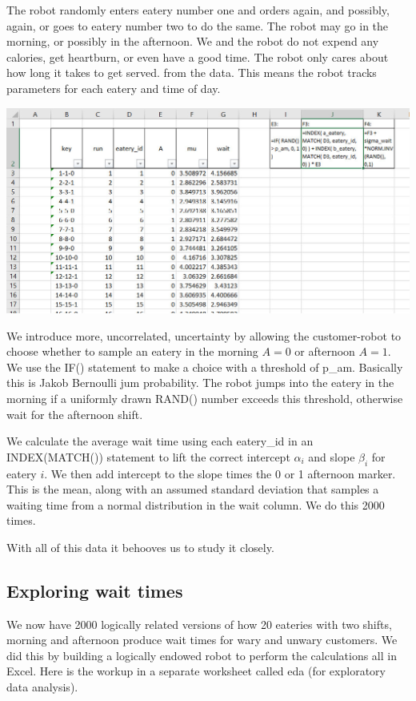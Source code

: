 \documentclass[
]{book}
\begin{document}
The robot randomly enters eatery number one and orders again, and possibly, again, or goes to eatery number two to do the same. The robot may go in the morning, or possibly in the afternoon. We and the robot do not expend any calories, get heartburn, or even have a good time. The robot only cares about how long it takes to get served.
from the data. This means the robot tracks parameters for each eatery and time of day.

\includegraphics{images/05/eatery-simulation-calculation.jpg}

We introduce more, uncorrelated, uncertainty by allowing the customer-robot to choose whether to sample an eatery in the morning \(A=0\) or afternoon \(A=1\). We use the IF() statement to make a choice with a threshold of p\_am. Basically this is Jakob Bernoulli jum probability. The robot jumps into the eatery in the morning if a uniformly drawn RAND() number exceeds this threshold, otherwise wait for the afternoon shift.

We calculate the average wait time using each eatery\_id in an INDEX(MATCH()) statement to lift the correct intercept \(\alpha_i\) and slope \(\beta_i\) for eatery \(i\). We then add intercept to the slope times the 0 or 1 afternoon marker. This is the mean, along with an assumed standard deviation that samples a waiting time from a normal distribution in the wait column. We do this 2000 times.

With all of this data it behooves us to study it closely.

\hypertarget{exploring-wait-times}{%
\subsection{Exploring wait times}\label{exploring-wait-times}}

We now have 2000 logically related versions of how 20 eateries with two shifts, morning and afternoon produce wait times for wary and unwary customers. We did this by building a logically endowed robot to perform the calculations all in Excel. Here is the workup in a separate worksheet called eda (for \citet{Tukey1977} exploratory data analysis).
\end{document}
